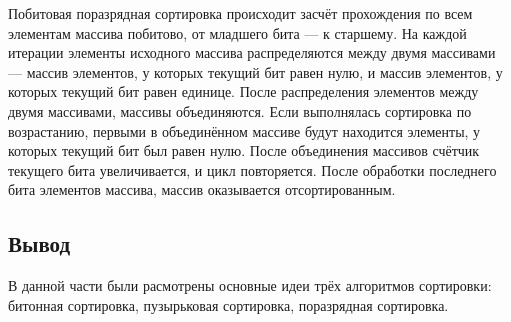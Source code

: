 Побитовая поразрядная сортировка происходит засчёт прохождения по всем элементам массива побитово, от младшего бита --- к старшему.
На каждой итерации элементы исходного массива распределяются между двумя массивами --- массив элементов, у которых текущий бит равен нулю, и массив элементов, у которых текущий бит равен единице.
После распределения элементов между двумя массивами, массивы объединяются.
Если выполнялась сортировка по возрастанию, первыми в объединённом массиве будут находится элементы, у которых текущий бит был равен нулю.
После объединения массивов счётчик текущего бита увеличивается, и цикл повторяется.
После обработки последнего бита элементов массива, массив оказывается отсортированным.

\subsection*{Вывод}

В данной части были расмотрены основные идеи трёх алгоритмов сортировки: битонная сортировка, пузырьковая сортировка, поразрядная сортировка.
